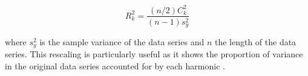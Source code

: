 \begin{equation}
R_k^2 = \frac{(n/2)C_k^2}{(n-1)s_y^2}
\end{equation}

where $s_y^2$ is the sample variance of the data series and $n$ the length of the data series. This rescaling is particularly useful as it shows the proportion of variance in the original data series accounted for by each harmonic \citep{Wilks2011}.